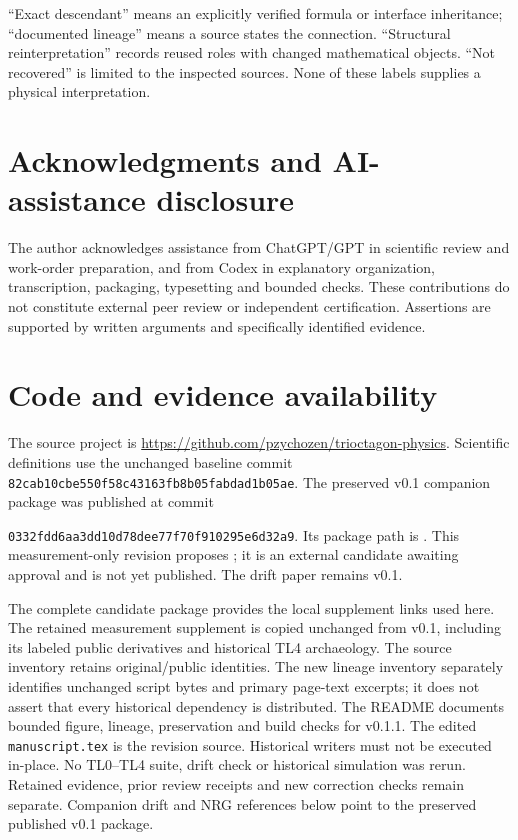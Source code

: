 \documentclass[11pt,a4paper]{article}
\begin{document}
\textquotedblleft{}Exact descendant\textquotedblright{} means an explicitly verified formula or interface inheritance; \textquotedblleft{}documented lineage\textquotedblright{} means a source states the connection. \textquotedblleft{}Structural reinterpretation\textquotedblright{} records reused roles with changed mathematical objects. \textquotedblleft{}Not recovered\textquotedblright{} is limited to the inspected sources. None of these labels supplies a physical interpretation.


\section*{Acknowledgments and AI-assistance disclosure}
The author acknowledges assistance from ChatGPT/GPT in scientific review and work-order preparation, and from Codex in explanatory organization, transcription, packaging, typesetting and bounded checks. These contributions do not constitute external peer review or independent certification. Assertions are supported by written arguments and specifically identified evidence.
\section*{Code and evidence availability}
The source project is \url{https://github.com/pzychozen/trioctagon-physics}. Scientific definitions use the unchanged baseline commit \texttt{82cab10cbe550f58c43163fb8b05fabdad1b05ae}.
The preserved v0.1 companion package was published at commit\par\smallskip\texttt{0332fdd6aa3dd10d78dee77f70f910295e6d32a9}. Its package path is . This measurement-only revision proposes ; it is an external candidate awaiting approval and is not yet published. The drift paper remains v0.1.

The complete candidate package provides the local supplement links used here. The retained measurement supplement is copied unchanged from v0.1, including its labeled public derivatives and historical TL4 archaeology. The source inventory retains original/public identities. The new lineage inventory separately identifies unchanged script bytes and primary page-text excerpts; it does not assert that every historical dependency is distributed.
The README documents bounded figure, lineage, preservation and build checks for v0.1.1. The edited \texttt{manuscript.tex} is the revision source. Historical writers must not be executed in-place. No TL0--TL4 suite, drift check or historical simulation was rerun. Retained evidence, prior review receipts and new correction checks remain separate. Companion drift and NRG references below point to the preserved published v0.1 package.
\end{document}
